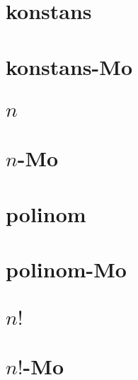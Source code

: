 \begin{spacing}{1.2}
         \section*{konstans} \label{nthroot1}
         \Fa{
            
         }
         \newpage
         \section*{konstans-Mo} \label{nthroot1Mo}
         \Mo{
            
         }
         \newpage
         \section*{$n$} \label{nthroot2}
         \Fa{
            
         }
         \newpage
         \section*{$n$-Mo} \label{nthroot2Mo}
         \Mo{
            
         }
         \newpage
         \section*{polinom} \label{nthroot2a}
         \Fa{
            
         }
         \newpage
         \section*{polinom-Mo} \label{nthroot2aMo}
         \Mo{
            
         }
         \newpage
         \section*{$n!$} \label{nthroot3}
         \Fa{
            
         }
         \newpage
         \section*{$n!$-Mo} \label{nthroot3Mo}
         \Mo{
            
         }
         \newpage

\end{spacing}


